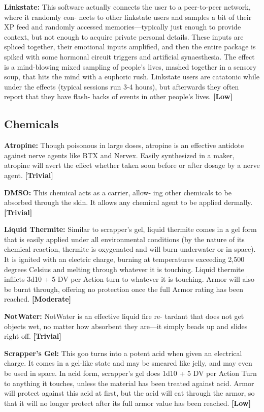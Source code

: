 \textbf{Linkstate:} This software actually connects the user 
to a peer-to-peer network, where it randomly con-
nects to other linkstate users and samples a bit of their 
XP feed and randomly accessed memories—typically 
just enough to provide context, but not enough to 
acquire private personal details. These inputs are 
spliced together, their emotional inputs amplified, and 
then the entire package is spiked with some hormonal 
circuit triggers and artificial synaesthesia. The effect 
is a mind-blowing mixed sampling of people's lives, 
mashed together in a sensory soup, that hits the mind 
with a euphoric rush. Linkstate users are catatonic 
while under the effects (typical sessions run 3-4 hours), 
but afterwards they often report that they have flash-
backs of events in other people's lives. \textbf{[Low]}

\subsection{Chemicals}

\textbf{Atropine:} Though poisonous in large doses, atropine 
is an effective antidote against nerve agents like BTX
and Nervex. Easily synthesized in a maker, atropine 
will avert the effect whether taken soon before or after 
dosage by a nerve agent. \textbf{[Trivial]}

\textbf{DMSO:} This chemical acts as a carrier, allow-
ing other chemicals to be absorbed through the 
skin. It allows any chemical agent to be applied 
dermally. \textbf{[Trivial]}

\textbf{Liquid Thermite:} Similar to scrapper's gel, liquid 
thermite comes in a gel form that is easily applied 
under all environmental conditions (by the nature 
of its chemical reaction, thermite is oxygenated and 
will burn underwater or in space). It is ignited with 
an electric charge, burning at temperatures exceeding 
2,500 degrees Celsius and melting through whatever 
it is touching. Liquid thermite inflicts 3d10 + 5 DV per 
Action turn to whatever it is touching. Armor will also 
be burnt through, offering no protection once the full 
Armor rating has been reached. \textbf{[Moderate]}

\textbf{NotWater:} NotWater is an effective liquid fire re-
tardant that does not get objects wet, no matter how 
absorbent they are—it simply beads up and slides 
right off. \textbf{[Trivial]}

\textbf{Scrapper's Gel:} This goo turns into a potent acid 
when given an electrical charge. It comes in a gel-like 
state and may be smeared like jelly, and may even be 
used in space. In acid form, scrapper's gel does 1d10 
+ 5 DV per Action Turn to anything it touches, unless 
the material has been treated against acid. Armor will 
protect against this acid at first, but the acid will eat 
through the armor, so that it will no longer protect 
after its full armor value has been reached. \textbf{[Low]}

